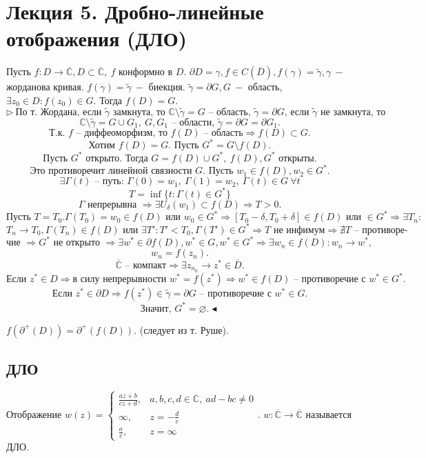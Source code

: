 \section{Лекция 5. Дробно-линейные отображения (ДЛО)}

 Пусть $f: D \to \overline{\mathbb{C}}, D \subset \overline{\mathbb{C}}, \ f$ конформно в $D$. $\partial D = \gamma, f\in C(\overline{D}), f(\gamma) = \tilde{\gamma}, \gamma \ -$ жорданова кривая. $f(\gamma)=\tilde\gamma \ -$ биекция. $\tilde\gamma = \partial G, G \ -$ область, $\exists z_0\in D: f(z_0)\in G.$ Тогда $f(D)=G$.
\[\triangleright \ \text{По т. Жордана, если $\tilde\gamma$ замкнута, то $\mathbb{C}\setminus \tilde\gamma = G$ -- область, $\tilde\gamma = \partial G$, если $\tilde\gamma$ не замкнута, то}\] 
\[\mathbb{C} \setminus \tilde\gamma = G \cup G_1, \ G, G_1 \text{ -- области, } \tilde\gamma = \partial G = \partial G_1.\]
\[\text{Т.к. $f$ -- диффеоморфизм, то $f(D)$ -- область} \Rightarrow f(D) \subset G.\]
\[\text{Хотим } f(D) = G. \text{ Пусть } G^* = G \setminus f(D).\]
\[\text{Пусть $G^*$ открыто. Тогда } G = f(D) \cup G^*, \ f(D), G^* \text{ открыты.}\]
\[\text{Это противоречит линейной связности } G. \text{ Пусть } w_1 \in f(D), w_2 \in G^*.\] 
\[\exists \Gamma(t) \text{ -- путь: } \Gamma(0) = w_1,\ \Gamma(1) = w_2, \ \Gamma(t) \in G \ \forall t\]
\[T = \inf \{t: \Gamma(t) \in G^*\}\]
\[\Gamma \text{ непрерывна } \Rightarrow \exists U_\delta(w_1) \subset f(D) \Rightarrow T >0.\]
\[\text{Пусть } T = T_0. \Gamma(T_0) = w_0 \in f(D) \text{ или } w_0\in G^* \Rightarrow [T_0 - \delta, T_0 + \delta] \in f(D) \text{ или } \in G^* \Rightarrow \exists T_n:\] 
\[T_n \to T_0, \Gamma(T_n) \in f(D) \text{ или } \exists T': T' < T_0, \Gamma(T') \in G^* \Rightarrow T \text{ не инфимум} \Rightarrow \nexists T \text{ -- противоре-}\] 
\[\text{чие }\Rightarrow G^* \text{ не открыто } \Rightarrow \exists w^* \in \partial f(D), w^* \in G, w^* \in G^* \Rightarrow \exists w_n\in f(D): w_n \to w^*,\] 
\[w_n = f(z_n).\]
\[\overline{\mathbb{C}} \text{ -- компакт} \Rightarrow \exists z_{n_k} \to z^* \in \overline{D}.\]
\[\text{Если } z^* \in D \Rightarrow \text{в силу непрерывности } w^* = f(z^*) \Rightarrow w^* \in f(D) \text{ -- противоречие с } w^* \in G^*.\]
\[\text{Если }z^* \in \partial D \Rightarrow f(z^*) \in \tilde\gamma = \partial G \text{ -- противоречие с } w^* \in G.\]
\[\text{Значит, } G^* = \varnothing. \blacktriangleleft\]

 $f(\partial^+(D)) = \partial^+ (f(D))$. (следует из т. Руше).
\subsection{ДЛО}
 Отображение $w(z) = \begin{cases}
    \frac{az+b}{cz+d}, & a, b, c, d \in \mathbb{C}, \ ad-bc \neq 0 \\
    \infty, & z = -\frac{d}{c} \\
    \frac{a}{c}, & z =\infty
\end{cases}.$ $w: \overline{\mathbb{C}}\to \overline{\mathbb{C}}$ называется ДЛО.

